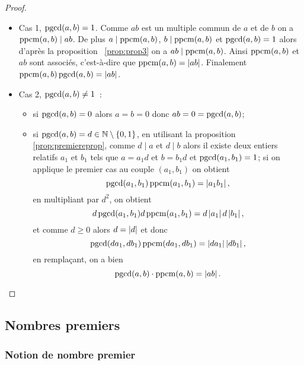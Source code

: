 \begin{proof}
  \begin{itemize}
  \item Cas 1, \(\operatorname{pgcd}(a,b)=1\). Comme \(ab\) est un multiple commun de \(a\) et de \(b\) on a \(\operatorname{ppcm}(a,b) \mid ab\). De plus \(a \mid \operatorname{ppcm}(a,b)\), \(b \mid \operatorname{ppcm}(a,b)\) et \(\operatorname{pgcd}(a,b)=1\) alors d'après la proposition~
\ref{prop:prop3} on a \(ab \mid \operatorname{ppcm}(a,b)\). Ainsi \(\operatorname{ppcm}(a,b)\) et \(ab\) sont associés, c'est-à-dire que \(\operatorname{ppcm}(a,b)=\left\lvert ab\right\rvert\). Finalement  \(\operatorname{ppcm}(a,b)\operatorname{pgcd}(a,b)=\left\lvert ab\right\rvert\).
  \item Cas 2, \(\operatorname{pgcd}(a,b) \neq 1\)~:
    \begin{itemize}
    \item si \(\operatorname{pgcd}(a,b) = 0\) alors \(a=b=0\) donc \(ab=0=\operatorname{pgcd}(a,b)\);
    \item si \(\operatorname{pgcd}(a,b)=d \in \mathbb{N}\setminus\{0,1\}\), en utilisant la proposition~
\ref{prop:premiereprop}, comme \(d  \mid a\) et \(d \mid b\) alors il existe deux entiers relatifs \(a_1\) et \(b_1\) tels que \(a=a_1 d\) et \(b=b_1d\) et \(\operatorname{pgcd}(a_1,b_1)=1\); si on applique le premier cas au couple \((a_1,b_1)\) on obtient
      \begin{equation}
        \operatorname{pgcd}(a_1,b_1) \operatorname{ppcm}(a_1,b_1) = \left\lvert a_1b_1\right\rvert,
      \end{equation}
      en multipliant par \(d^2\), on obtient
      \begin{equation}
        d\operatorname{pgcd}(a_1,b_1) d\operatorname{ppcm}(a_1,b_1) = d\left\lvert a_1\right\rvert d\left\lvert b_1\right\rvert,
      \end{equation}
      et comme \(d\geqslant 0\) alors \(d=\left\lvert d\right\rvert\) et donc    
    \begin{equation}
       \operatorname{pgcd}(da_1,db_1) \operatorname{ppcm}(da_1,db_1) = \left\lvert da_1\right\rvert \left\lvert db_1\right\rvert,
     \end{equation}
     en remplaçant, on a bien
     \begin{equation}
       \operatorname{pgcd}(a,b) \cdot \operatorname{ppcm}(a,b)= \left\lvert ab\right\rvert.
     \end{equation}
     \end{itemize}
  \end{itemize}
\end{proof}

\subsection{Nombres premiers}

\subsubsection{Notion de nombre premier}

